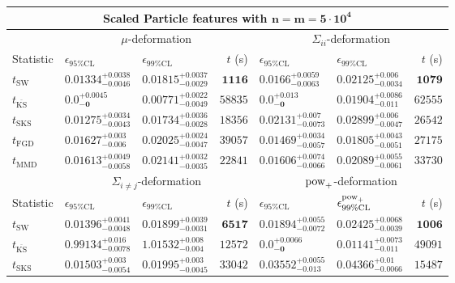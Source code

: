 \begin{tabular}{l|llr|llr}
	\toprule
	\multicolumn{7}{c}{{\bf Scaled Particle features with $\mathbf{n=m=5\cdot 10^{4}}$}} \\
	\toprule
	\multicolumn{1}{c}{} & \multicolumn{3}{c}{$\mu$-deformation} & \multicolumn{3}{c}{$\Sigma_{ii}$-deformation} \\
	Statistic & $\epsilon_{95\%\mathrm{CL}}$ & $\epsilon_{99\%\mathrm    {CL}}$ & $t$ (s) & $\epsilon_{95\%\mathrm{CL}}$ & $\epsilon_{99\%\mathrm{CL}}$ & $t$ (s) \\
	\midrule
	$t_{\mathrm{SW}}$ & $0.01334_{-0.0046}^{+0.0038}$ & $0.01815_{-0.0029}^{+0.0037}$ & ${\mathbf{1116}}$ & $0.0166_{-0.0063}^{+0.0059}$ & $0.02125_{-0.0034}^{+0.006}$ & ${\mathbf{1079}}$ \\
	$t_{\overline{\mathrm{KS}}}$ & ${\mathbf{0.0_{-0}^{+0.0045}}}$ & ${\mathbf{0.00771_{-0.0049}^{+0.0022}}}$ & $58835$ & ${\mathbf{0.0_{-0}^{+0.013}}}$ & $0.01904_{-0.011}^{+0.0086}$ & $62555$ \\
	$t_{\mathrm{SKS}}$ & $0.01275_{-0.0043}^{+0.0034}$ & $0.01734_{-0.0028}^{+0.0036}$ & $18356$ & $0.02131_{-0.0073}^{+0.007}$ & $0.02899_{-0.0047}^{+0.006}$ & $26542$ \\
	$t_{\mathrm{FGD}}$ & $0.01627_{-0.006}^{+0.003}$ & $0.02025_{-0.0047}^{+0.0024}$ & $39057$ & $0.01469_{-0.0057}^{+0.0034}$ & ${\mathbf{0.01805_{-0.0051}^{+0.0043}}}$ & $27175$ \\
	$t_{\mathrm{MMD}}$ & $0.01613_{-0.0058}^{+0.0049}$ & $0.02141_{-0.0035}^{+0.0032}$ & $22841$ & $0.01606_{-0.0066}^{+0.0074}$ & $0.02089_{-0.0061}^{+0.0055}$ & $33730$ \\
	\toprule
	\multicolumn{1}{c}{} & \multicolumn{3}{c}{$\Sigma_{i\neq j}$-deformation} & \multicolumn{3}{c}{$\rm{pow}_{+}$-deformation} \\
	Statistic & $\epsilon_{95\%\mathrm{CL}}$ & $\epsilon_{99\%\mathrm{CL}}$ & $t$ (s) & $\epsilon_{95\%\mathrm{CL}}$ & $\epsilon^{\rm   {pow}_{+}}_{99\%\mathrm{CL}}$ & $t$ (s) \\
	\midrule
	$t_{\mathrm{SW}}$ & $0.01396_{-0.0048}^{+0.0041}$ & $0.01899_{-0.0031}^{+0.0039}$ & ${\mathbf{6517}}$ & $0.01894_{-0.0072}^{+0.0055}$ & $0.02425_{-0.0039}^{+0.0068}$ & ${\mathbf{1006}}$ \\
	$t_{\overline{\mathrm{KS}}}$ & $0.99134_{-0.0078}^{+0.016}$ & $1.01532_{-0.004}^{+0.008}$ & $12572$ & ${\mathbf{0.0_{-0}^{+0.0066}}}$ & ${\mathbf{0.01141_{-0.011}^{+0.0073}}}$ & $49091$ \\
	$t_{\mathrm{SKS}}$ & $0.01503_{-0.0054}^{+0.003}$ & $0.01995_{-0.0045}^{+0.003}$ & $33042$ & $0.03552_{-0.013}^{+0.0055}$ & $0.04366_{-0.0066}^{+0.01}$ & $15487$ \\

\end{tabular}
